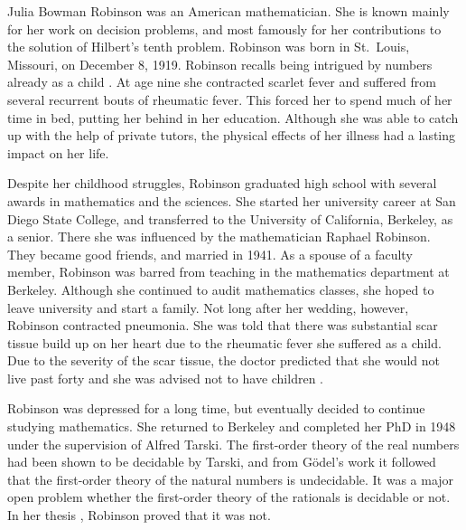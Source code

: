 \documentclass[../../../include/open-logic-section]{subfiles}
\begin{document}



Julia Bowman Robinson was an American mathematician. She is known
mainly for her work on decision problems, and most famously for her
contributions to the solution of Hilbert's tenth problem. Robinson was
born in St.~Louis, Missouri, on December 8, 1919. Robinson recalls
being intrigued by numbers already as a child \citep[4]{Reid1986}.
At age nine she contracted scarlet fever and suffered from several
recurrent bouts of rheumatic fever. This forced her to spend much of
her time in bed, putting her behind in her education.  Although she
was able to catch up with the help of private tutors, the physical
effects of her illness had a lasting impact on her life.

Despite her childhood struggles, Robinson graduated high school with
several awards in mathematics and the sciences. She started her
university career at San Diego State College, and transferred to the
University of California, Berkeley, as a senior. There she was
influenced by the mathematician Raphael Robinson. They became good
friends, and married in 1941. As a spouse of a faculty member,
Robinson was barred from teaching in the mathematics department at
Berkeley. Although she continued to audit mathematics classes, she
hoped to leave university and start a family. Not long after her
wedding, however, Robinson contracted pneumonia. She was told that
there was substantial scar tissue build up on her heart due to the
rheumatic fever she suffered as a child. Due to the severity of the
scar tissue, the doctor predicted that she would not live past forty
and she was advised not to have children \citep[13]{Reid1986}.

Robinson was depressed for a long time, but eventually decided to
continue studying mathematics. She returned to Berkeley and completed
her PhD in 1948 under the supervision of Alfred Tarski. The
first-order theory of the real numbers had been shown to be decidable
by Tarski, and from G\"odel's work it followed that the first-order
theory of the natural numbers is undecidable.  It was a major open
problem whether the first-order theory of the rationals is decidable
or not. In her thesis \citeyearpar{Robinson1949}, Robinson proved that
it was not. 
\end{document}
